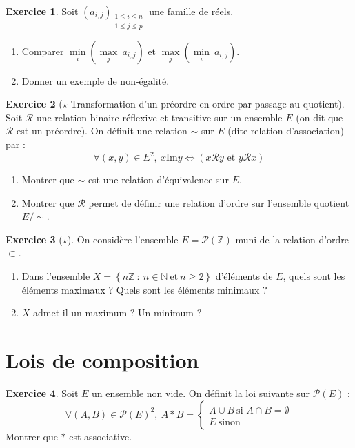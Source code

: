 \documentclass[french]{book}
\newcommand{\N}{\mathbb{N}}
\newcommand{\Z}{\mathbb{Z}}
\newcommand{\im}{\text{Im}}
\theoremstyle{definition}
\newtheorem{ex}{Exercice}[chapter]
\theoremstyle{theorem}
\theoremstyle{remark}
\begin{document}
\begin{ex}
	Soit $(a_{i,j})_{\substack{1\leqslant i\leqslant n \\ 1\leqslant j\leqslant p}}$ une famille de réels. 
	\begin{enumerate}
		\item Comparer $\underset{i}{\min}\left(\underset{j}{\max}\ a_{i,j}\right)$ et $\underset{j}{\max}\left(\underset{i}{\min}\ a_{i,j}\right)$.
		\item Donner un exemple de non-égalité.
	\end{enumerate}
\end{ex}

\begin{ex}[$\star$ Transformation d'un préordre en ordre par passage au quotient]
	Soit $\mathcal{R}$ une relation binaire réflexive et transitive sur un ensemble $E$ (on dit que $\mathcal{R}$ est un préordre). On définit une relation $\sim$ sur $E$ (dite relation d'association) par : $$\forall (x,y)\in E^2,\ x\im y\iff (x\mathcal{R}y\text{ et }y\mathcal{R}x)$$
	\begin{enumerate}
		\item Montrer que $\sim$ est une relation d'équivalence sur $E$.
		\item Montrer que $\mathcal{R}$ permet de définir une relation d'ordre sur l'ensemble quotient $E/\sim$.
	\end{enumerate}
\end{ex}

\begin{ex}[$\star$]
	On considère l'ensemble $E=\mathcal{P}(\Z)$ muni de la relation d'ordre $\subset$.
	\begin{enumerate}
		\item Dans l'ensemble $X=\left\{n\Z\ : \ n\in\N\ \text{et}\ n\geqslant 2\right\}$ d'éléments de $E$, quels sont les éléments maximaux ? Quels sont les éléments minimaux ?
		\item $X$ admet-il un maximum ? Un minimum ?
	\end{enumerate}
\end{ex}

\section{Lois de composition}

\begin{ex}
	Soit $E$ un ensemble non vide. On définit la loi suivante sur $\mathcal{P}(E)$ : $$\forall (A,B)\in\mathcal{P}(E)^2,\ A*B=\begin{cases}
		A\cup B\ \text{si }A\cap B=\emptyset \\
		E \ \text{sinon}
	\end{cases}$$ Montrer que $*$ est associative.
\end{ex}
\end{document}

